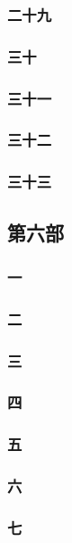 \subsubsection*{二十九}
\subsubsection*{三十}
\subsubsection*{三十一}
\subsubsection*{三十二}
\subsubsection*{三十三}






\subsection*{第六部}





\subsubsection*{一}
\subsubsection*{二}
\subsubsection*{三}
\subsubsection*{四}
\subsubsection*{五}
\subsubsection*{六}
\subsubsection*{七}

